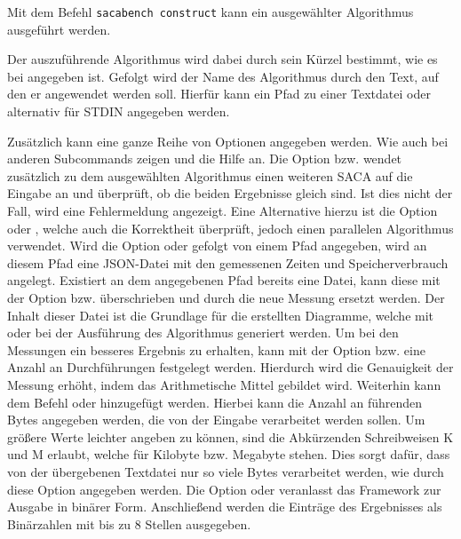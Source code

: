 {Mit dem Befehl \texttt{sacabench construct} kann ein ausgewählter Algorithmus ausgeführt werden. 
\par
Der auszuf{\"u}hrende Algorithmus wird dabei durch sein K{\"u}rzel bestimmt, wie es bei  angegeben ist. 
Gefolgt wird der Name des Algorithmus durch den Text, auf den er angewendet werden soll. 
Hierf{\"u}r kann ein Pfad zu einer Textdatei oder alternativ \termfont{-} f{\"u}r STDIN angegeben werden. 
\par
Zus{\"a}tzlich kann eine ganze Reihe von Optionen angegeben werden. 
Wie auch bei anderen Subcommands zeigen  und  die Hilfe an. 
Die Option  bzw.  wendet zus{\"a}tzlich zu dem ausgew{\"a}hlten Algorithmus einen weiteren SACA auf die Eingabe an und {\"u}berpr{\"u}ft, ob die beiden Ergebnisse gleich sind. 
Ist dies nicht der Fall, wird eine Fehlermeldung angezeigt. 
Eine Alternative hierzu ist die Option  oder , welche auch die Korrektheit überprüft, jedoch einen parallelen Algorithmus verwendet. 
Wird die Option  oder  gefolgt von einem Pfad angegeben, wird an diesem Pfad eine JSON-Datei mit den gemessenen Zeiten und Speicherverbrauch angelegt. 
Existiert an dem angegebenen Pfad bereits eine Datei, kann diese mit der Option  bzw.  {\"u}berschrieben und durch die neue Messung ersetzt werden. 
Der Inhalt dieser Datei ist die Grundlage f{\"u}r die erstellten Diagramme, welche mit  oder  bei der Ausf{\"u}hrung des Algorithmus generiert werden. 
Um bei den Messungen ein besseres Ergebnis zu erhalten, kann mit der Option  bzw.  eine Anzahl an Durchf{\"u}hrungen festgelegt werden. 
Hierdurch wird die Genauigkeit der Messung erh{\"o}ht, indem das Arithmetische Mittel gebildet wird.
Weiterhin kann dem Befehl  oder  hinzugef{\"u}gt werden. 
Hierbei kann die Anzahl an f{\"u}hrenden Bytes angegeben werden, die von der Eingabe verarbeitet werden sollen.
Um gr{\"o}{\ss}ere Werte leichter angeben zu k{\"o}nnen, sind die Abk{\"u}rzenden Schreibweisen K und M erlaubt, welche f{\"u}r Kilobyte bzw. Megabyte stehen.
Dies sorgt daf{\"u}r, dass von der {\"u}bergebenen Textdatei nur so viele Bytes verarbeitet werden, wie durch diese Option angegeben werden. 
Die Option  oder  veranlasst das Framework zur Ausgabe in bin{\"a}rer Form.
Anschlie{\ss}end werden die Eintr{\"a}ge des Ergebnisses als Bin{\"a}rzahlen mit bis zu 8 Stellen ausgegeben. 
}
